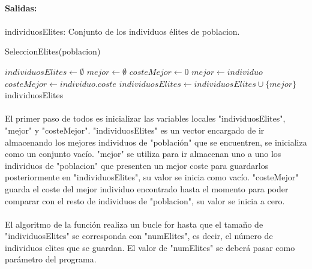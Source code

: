 	\paragraph{Salidas:}
	
	\paragraph{}individuosElites: Conjunto de los individuos élites de poblacion.

	\begin{algorithm}[H]
		\caption{SeleccionElites(poblacion)}
		\begin{algorithmic}
			\STATE $individuosElites \leftarrow \emptyset$
			\STATE $mejor \leftarrow \emptyset$
			\STATE $costeMejor \leftarrow 0$
			\STATE $mejor \leftarrow individuo$
			\STATE $costeMejor \leftarrow individuo.coste$
			\ENDIF
			\ENDFOR
			\STATE $individuosElites \leftarrow individuosElites\cup\{mejor\}$
			\ENDWHILE
			\RETURN individuosElites
		\end{algorithmic}
	\end{algorithm}

	\paragraph{}El primer paso de todos es inicializar las variables locales "individuosElites", "mejor" y "costeMejor". "individuosElites" es un vector encargado de ir almacenando los mejores individuos de "población" que se encuentren, se inicializa como un conjunto vacío. "mejor" se utiliza para ir almacenan uno a uno los individuos de "poblacion" que presenten un mejor coste para guardarlos posteriormente en "individuosElites", su valor se inicia como vacío. "costeMejor" guarda el coste del mejor individuo encontrado hasta el momento para poder comparar con el resto de individuos de "poblacion", su valor se inicia a cero.
	
	\paragraph{}El algoritmo de la función realiza un bucle for hasta que el tamaño de "individuosElites" se corresponda con "numElites", es decir, el número de individuos elites que se guardan. El valor de "numElites" se deberá pasar como parámetro del programa.
	
